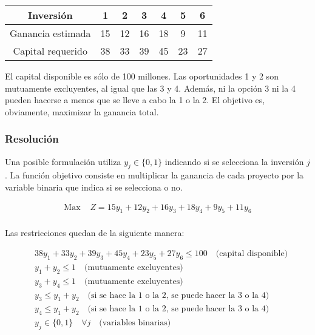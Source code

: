 \documentclass[12pt]{article}
\begin{document}
\begin{table}[H]
    \centering
    \begin{tabular}{c|cccccc}
        \toprule
        Inversión & 1 & 2 & 3 & 4 & 5 & 6 \\
        \midrule
        Ganancia estimada & 15 & 12 & 16 & 18 & 9 & 11 \\
        Capital requerido & 38 & 33 & 39 & 45 & 23 & 27 \\
        \bottomrule
    \end{tabular}
\end{table}

\vspace{0.5em}
El capital disponible es sólo de 100 millones. Las oportunidades 1 y 2 son mutuamente excluyentes, al igual que las 3 y 4. Además, ni la opción 3 ni la 4 pueden hacerse a menos que se lleve a cabo la 1 o la 2. El objetivo es, obviamente, maximizar la ganancia total.

\subsubsection{Resolución}

Una posible formulación utiliza $y_j \in \{0,1\}$ indicando si se selecciona la inversión $j$. La función objetivo consiste en multiplicar la ganancia de cada proyecto por la variable binaria que indica si se selecciona o no.

\begin{align*}
    \text{Max } & Z = 15y_1 + 12y_2 + 16y_3 + 18y_4 + 9y_5 + 11y_6 \\
\end{align*}

Las restricciones quedan de la siguiente manera:

\begin{align*}
    & 38y_1 + 33y_2 + 39y_3 + 45y_4 + 23y_5 + 27y_6 \le 100 \quad \text{(capital disponible)} \\
    & y_1 + y_2 \le 1 \quad \text{(mutuamente excluyentes)} \\
    & y_3 + y_4 \le 1 \quad \text{(mutuamente excluyentes)} \\
    & y_3 \le y_1 + y_2 \quad \text{(si se hace la 1 o la 2, se puede hacer la 3 o la 4)} \\
    & y_4 \le y_1 + y_2 \quad \text{(si se hace la 1 o la 2, se puede hacer la 3 o la 4)} \\
    & y_j \in \{0,1\} \quad \forall j \quad \text{(variables binarias)}
\end{align*}
\end{document}
